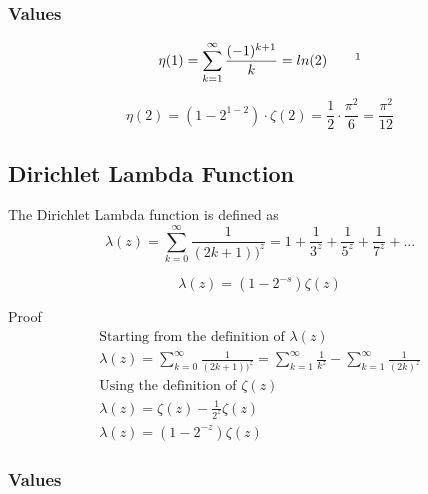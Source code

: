 \documentclass[a4paper]{article}
\begin{document}
\subsubsection{Values}
\begin{equation}
\eta(1) = \sum_{k=1}^{\infty} \frac{(-1)^{k+1}}{k} = ln(2) \quad \quad \footnotemark 
\end{equation}

\begin{equation} 
\eta(2) = (1 - 2^{1-2}) \cdot \zeta(2) =
\frac{1}{2} \cdot \frac{\pi^2}{6} = \frac{\pi^2}{12} 
\end{equation}


\pagebreak

\subsection{Dirichlet Lambda Function}

\begin{definition}\label{zf:Dirichlet Lambda Function def}
The Dirichlet Lambda function is defined as 
$$
\lambda(z) = \sum_{k=0}^{\infty} \frac{1}{(2k +1))^z} = 1 + \frac{1}{3^z} +  \frac{1}{5^z} +  \frac{1}{7^z} + ...
$$
\end{definition}

\begin{theorem}
\begin{equation}
\boxed{
\lambda(z) = (1 - 2^{-s}) \zeta(z)
}
\end{equation}

Proof
\\
\begin{gather*}
\text{Starting from the definition of $\lambda(z)$}
\\
\lambda(z) 
=
\sum_{k=0}^{\infty} \frac{1}{(2k +1))^z}
=
\sum_{k=1}^{\infty} \frac{1}{k^z} - \sum_{k=1}^{\infty} \frac{1}{(2k)^z}
\\
\text{Using the definition of $\zeta(z)$}
\\
\lambda(z) 
=
\zeta(z) - \frac{1}{2^{z}} \zeta(z)
\\
\lambda(z) = (1 - 2^{-z}) \zeta(z)
\end{gather*}
\end{theorem}

\subsubsection{Values}
\end{document}
